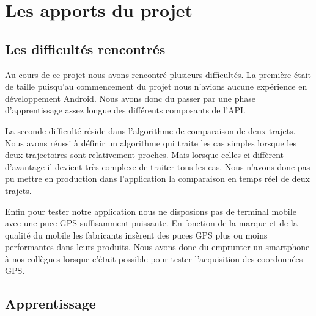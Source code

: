 \chapter{Les apports du projet}
\section{Les difficultés rencontrés}
Au cours de ce projet nous avons rencontré plusieurs difficultés. La première était de taille puisqu'au commencement du projet nous n'avions aucune expérience en développement Android. Nous avons donc du passer par une phase d'apprentissage assez longue des différents composants de l'API.\bigskip

La seconde difficulté réside dans l'algorithme de comparaison de deux trajets. Nous avons réussi à définir un algorithme qui traite les cas simples lorsque les deux trajectoires sont relativement proches. Mais lorsque celles ci diffèrent d'avantage il devient très complexe de traiter tous les cas. Nous n'avons donc pas pu mettre en production dans l'application la comparaison en temps réel de deux trajets.\bigskip

Enfin pour tester notre application nous ne disposions pas de terminal mobile avec une puce GPS suffisamment puissante. En fonction de la marque et de la qualité du mobile les fabricants insèrent des puces GPS plus ou moins performantes dans leurs produits. Nous avons donc du emprunter un smartphone à nos collègues lorsque c'était possible pour tester l'acquisition des coordonnées GPS.\bigskip

\section{Apprentissage}
